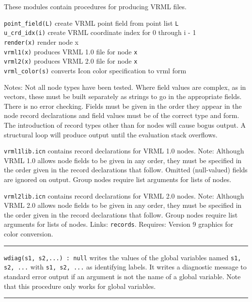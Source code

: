 These modules contain procedures for producing VRML files.

\texttt{point\_field(L)} create VRML point field from point list
\texttt{L\\
u\_crd\_idx(i)} create VRML coordinate index for 0 through i - 1\\
\texttt{render(x)} render node x\\
\texttt{vrml1(x)} produces VRML 1.0 file for node \texttt{x\\
vrml2(x)} produces VRML 2.0 file for node \texttt{x\\
vrml\_color(s)} converts Icon color specification to vrml form

Notes: Not all node types have been tested. Where field values are
complex, as in vectors, these must be built separately as strings to go
in the appropriate fields. There is no error checking. Fields must be
given in the order they appear in the node record declarations and
field values must be of the correct type and form. The introduction of
record types other than for nodes will cause bogus output. A structural
loop will produce output until the evaluation stack
overflows.

\texttt{vrml1lib.icn} contains record declarations for VRML 1.0 nodes.
Note: Although VRML 1.0 allows node fields to be given in any order,
they must be specified in the order given in the record declarations
that follow. Omitted (null-valued) fields are ignored on output. Group
nodes require list arguments for lists of nodes.

\texttt{vrml2lib.icn} contains record declarations for VRML 2.0 nodes.
Note: Although VRML 2.0 allows node fields to be given in any order,
they must be specified in the order given in the record declarations
that follow. Group nodes require list arguments for lists of nodes. 
Links: \texttt{records}. Requires: Version 9 graphics for color
conversion. 

\vspace{0.25cm}\hrule{}

\texttt{wdiag(s1, s2,...) : null} writes the values of the global
variables named \texttt{s1, s2, ...} with \texttt{s1, s2, ...} as
identifying labels. It writes a diagnostic message to standard error
output if an argument is not the name of a global variable. Note that
this procedure only works for global variables. 

\vspace{0.25cm}\hrule{}

